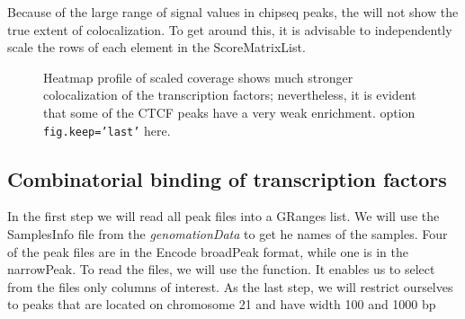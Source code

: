 \documentclass{article}\usepackage[]{graphicx}\usepackage[]{color}
\makeatletter
\newenvironment{kframe}{%
 \def\at@end@of@kframe{}%
 \ifinner\ifhmode%
  \def\at@end@of@kframe{\end{minipage}}%
  \begin{minipage}{\columnwidth}%
 \fi\fi%
 \def\FrameCommand##1{\hskip\@totalleftmargin \hskip-\fboxsep
 \colorbox{shadecolor}{##1}\hskip-\fboxsep
     \hskip-\linewidth \hskip-\@totalleftmargin \hskip\columnwidth}%
 \MakeFramed {\advance\hsize-\width
   \@totalleftmargin\z@ \linewidth\hsize
   \@setminipage}}%
 {\par\unskip\endMakeFramed%
 \at@end@of@kframe}
\newenvironment{knitrout}{}{} %
\newcommand{\Rpackage}[1]{{\textit{#1}}}
\makeatother
\begin{document}
Because of the large range of signal values in chipseq peaks, the  
will not show the true extent of colocalization. To get around this, it is advisable
to independently scale the rows of each element in the ScoreMatrixList.

\begin{figure}
\begin{knitrout}
\color{fgcolor}\begin{kframe}


{\ttfamily\noindent\bfseries{}}

{\ttfamily\noindent\bfseries{}}\end{kframe}
\end{knitrout}

\caption{Heatmap profile of scaled coverage shows much stronger colocalization of the transcription factors; nevertheless, it is evident that some of the CTCF peaks have a very weak enrichment.
option \texttt{fig.keep='last'} here.\label{fig:plotScaledProfile}}
\end{figure}

\subsection{Combinatorial binding of transcription factors}

In the first step we will read all peak files into a GRanges list. We will use the SamplesInfo file
from the \Rpackage{genomationData} to get he names of the samples. Four of the peak files are 
in the Encode broadPeak format, while one is in the narrowPeak. To read
the files, we will use the  function. It enables us to select 
from the files only columns of interest. As the last step, we will restrict ourselves to
peaks that are located on chromosome 21 and have width 100 and 1000 bp
\begin{knitrout}
\color{fgcolor}\begin{kframe}


{\ttfamily\noindent\itshape\color{messagecolor}{\#\# Ctcf}}

{\ttfamily\noindent\bfseries{}}

{\ttfamily\noindent\bfseries\color{errorcolor}{\#\# Error: Could not find a 'CompressedList' subclass for values of type 'NULLOptionalFunctionOptionalMethodCharacterORNULLDataTableORNULLFunctionORNULLConstraintORNULL'}}

{\ttfamily\noindent\bfseries{}}\end{kframe}
\end{knitrout}
\end{document}
